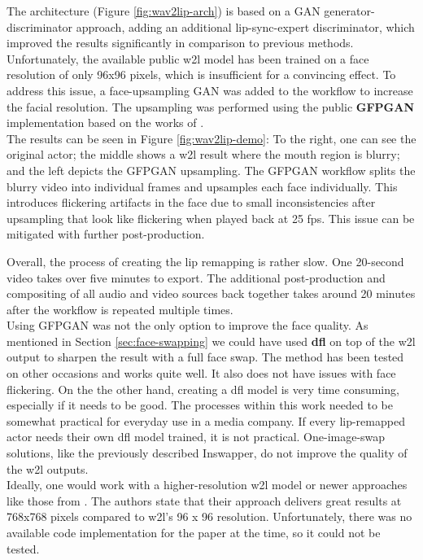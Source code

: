 \documentclass[
  a4paper,  %
  twoside,  %
  bibliography=totoc,
  headsepline,
  cleardoublepage=empty,
  parskip=half,
  draft=false
]{scrbook}
\begin{document}
The architecture (Figure \ref{fig:wav2lip-arch}) is based on a GAN generator-discriminator approach, adding an additional lip-sync-expert discriminator, which improved the results significantly in comparison to previous methods. \\
Unfortunately, the available public \gls{w2l} model has been trained on a face resolution of only 96x96 pixels, which is insufficient for a convincing effect. To address this issue, a face-upsampling GAN was added to the workflow to increase the facial resolution. The upsampling was performed using the public \textbf{GFPGAN} implementation based on the works of \citet{wangNeuralSourcefilterbasedWaveform2019}. \\
The results can be seen in Figure \ref{fig:wav2lip-demo}: To the right, one can see the original actor; the middle shows a \gls{w2l} result where the mouth region is blurry; and the left depicts the GFPGAN upsampling. The GFPGAN workflow splits the blurry video into individual frames and upsamples each face individually. This introduces flickering artifacts in the face due to small inconsistencies after upsampling that look like flickering when played back at 25 \gls{fps}. This issue can be mitigated with further post-production.

Overall, the process of creating the lip remapping is rather slow. One 20-second video takes over five minutes to export. The additional post-production and compositing of all audio and video sources back together takes around 20 minutes after the workflow is repeated multiple times. \\
Using GFPGAN was not the only option to improve the face quality. As mentioned in Section \ref{sec:face-swapping} we could have used \textbf{\gls{dfl}} on top of the \gls{w2l} output to sharpen the result with a full face swap. The method has been tested on other occasions and works quite well. It also does not have issues with face flickering. On the the other hand, creating a \gls{dfl} model is very time consuming, especially if it needs to be good. The processes within this work needed to be somewhat practical for everyday use in a media company. If every lip-remapped actor needs their own \gls{dfl} model trained, it is not practical. One-image-swap solutions, like the previously described Inswapper, do not improve the quality of the \gls{w2l} outputs. \\
Ideally, one would work with a higher-resolution \gls{w2l} model or newer approaches like those from \citet{guptaGeneratingUltraHighResolution2023}. The authors state that their approach delivers great results at 768x768 pixels compared to \gls{w2l}'s 96 x 96 resolution. Unfortunately, there was no available code implementation for the paper at the time, so it could not be tested.
\end{document}
